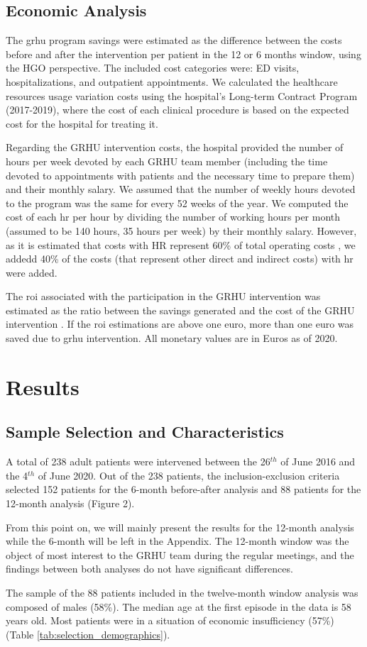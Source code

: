 \documentclass{bmcart}
\begin{document}
\subsection*{Economic Analysis}
The \gls{grhu} program savings were estimated as the difference between the costs before and after the intervention per patient in the 12 or 6 months window, using the HGO perspective. The included cost categories were: ED visits, hospitalizations, and outpatient appointments. 
We calculated the healthcare resources usage variation costs using the hospital’s Long-term Contract Program (2017-2019), where the cost of each clinical procedure is based on the expected cost for the hospital for treating it. 
\par Regarding the GRHU intervention costs, the hospital provided the number of hours per week devoted by each GRHU team member (including the time devoted to appointments with patients and the necessary time to prepare them) and their monthly salary.
We assumed that the number of weekly hours devoted to the program was the same for every 52 weeks of the year. We computed the cost of each \gls{hr} per hour by dividing the number of working hours per month (assumed to be 140 hours, 35 hours per week) by their monthly salary. However, as it is estimated that costs with HR represent 60\% of total operating costs \cite{balakrishnan_applying_2015}, we addedd 40\% of the costs (that represent other direct and indirect costs) with \gls{hr} were added. 
\par The \gls{roi} associated with the participation in the GRHU intervention was estimated as the ratio between the savings generated and the cost of the GRHU intervention \cite{navratil-strawn_emergency_2014}. 
If the \gls{roi} estimations are above one euro, more than one euro was saved due to \gls{grhu} intervention. All monetary values are in Euros as of 2020.

\section*{Results}

\subsection*{Sample Selection and Characteristics}
A total of 238 adult patients were intervened between the 26$^{th}$ of June 2016 and the 4$^{th}$ of June 2020. 
Out of the 238 patients, the inclusion-exclusion criteria selected 152 patients for the 6-month before-after analysis and 88 patients for the 12-month analysis (Figure 2).
\par From this point on, we will mainly present the results for the 12-month analysis while the 6-month will be left in the Appendix. The 12-month window was the object of most interest to the GRHU team during the regular meetings, and the findings between both analyses do not have significant differences.
\par The sample of the 88 patients included in the twelve-month window analysis was composed of males (58\%). The median age at the first episode in the data is 58 years old. Most patients were in a situation of economic insufficiency (57\%) (Table \ref{tab:selection_demographics}). 
\\
\end{document}
